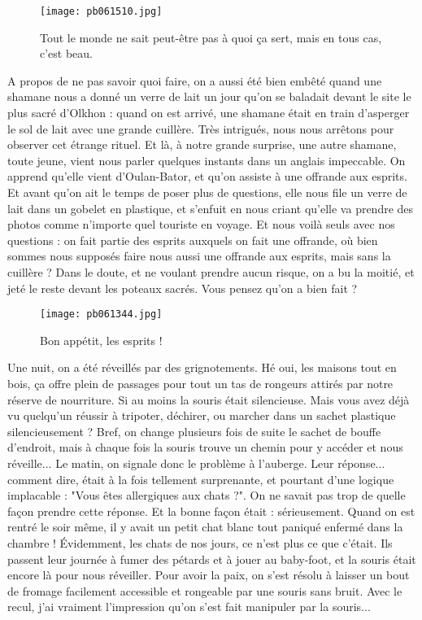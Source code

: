\documentclass{book}
\begin{document}
\begin{figure}[h]
\centering
\texttt{[image: pb061510.jpg]}
\caption*{ Tout le monde ne sait peut-être pas à quoi ça sert, mais en tous cas, c'est beau.}
\end{figure}

A propos de ne pas savoir quoi faire, on a aussi été bien embêté quand une shamane nous a donné un verre de lait un jour qu'on se baladait devant le site le plus sacré d'Olkhon : quand on est arrivé, une shamane était en train d'asperger le sol de lait avec une grande cuillère. Très intrigués, nous nous arrêtons pour observer cet étrange rituel. Et là, à notre grande surprise, une autre shamane, toute jeune, vient nous parler quelques instants dans un anglais impeccable. On apprend qu'elle vient d'Oulan-Bator, et qu'on assiste à une offrande aux esprits. Et avant qu'on ait le temps de poser plus de questions, elle nous file un verre de lait dans un gobelet en plastique, et s'enfuit en nous criant qu'elle va prendre des photos comme n'importe quel touriste en voyage. Et nous voilà seuls avec nos questions : on fait partie des esprits auxquels on fait une offrande, où bien sommes nous supposés faire nous aussi une offrande aux esprits, mais sans la cuillère ? Dans le doute, et ne voulant prendre aucun risque, on a bu la moitié, et jeté le reste devant les poteaux sacrés. Vous pensez qu'on a bien fait ?


\begin{figure}[h]
\centering
\texttt{[image: pb061344.jpg]}
\caption*{ Bon appétit, les esprits !}
\end{figure}

Une nuit, on a été réveillés par des grignotements. Hé oui, les maisons tout en bois, ça offre plein de passages pour tout un tas de rongeurs attirés par notre réserve de nourriture. Si au moins la souris était silencieuse. Mais vous avez déjà vu quelqu'un réussir à tripoter, déchirer, ou marcher dans un sachet plastique silencieusement ? Bref, on change plusieurs fois de suite le sachet de bouffe d'endroit, mais à chaque fois la souris trouve un chemin pour y accéder et nous réveille... Le matin, on signale donc le problème à l'auberge. Leur réponse... comment dire, était à la fois tellement surprenante, et pourtant d'une logique implacable : "Vous êtes allergiques aux chats ?". On ne savait pas trop de quelle façon prendre cette réponse. Et la bonne façon était : sérieusement. Quand on est rentré le soir même, il y avait un petit chat blanc tout paniqué enfermé dans la chambre ! Évidemment, les chats de nos jours, ce n'est plus ce que c'était. Ils passent leur journée à fumer des pétards et à jouer au baby-foot, et la souris était encore là pour nous réveiller. Pour avoir la paix, on s'est résolu à laisser un bout de fromage facilement accessible et rongeable par une souris sans bruit. Avec le recul, j'ai vraiment l'impression qu'on s'est fait manipuler par la souris...
\end{document}
